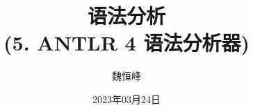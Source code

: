 \documentclass[]{beamer}
\title[语法分析]{语法分析 \\ (5. ANTLR 4 语法分析器)}
\author[魏恒峰]{\large 魏恒峰}
\institute{hfwei@nju.edu.cn}
\date{2023年03月24日}
\begin{document}
\maketitle


\thankyou{}

\end{document}

